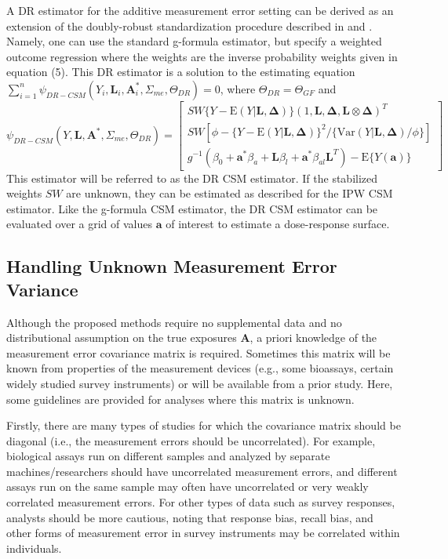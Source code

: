 \documentclass[useAMS,usenatbib,referee]{biom}
\begin{document}
A DR estimator for the additive measurement error setting can be derived as an extension of the doubly-robust standardization procedure described in \citet{vansteelandt2011} and \citet{kang2007}. Namely, one can use the standard g-formula estimator, but specify a weighted outcome regression where the weights are the inverse probability weights given in equation (5). This DR estimator is a solution to the estimating equation $\sum_{i=1}^{n} \psi_{DR-CSM}(Y_{i}, \bm{L}_{i}, \bm{A}_{i}^{*}, \Sigma_{me}, \Theta_{DR}) = 0$, where $\Theta_{DR} = \Theta_{GF}$ and
\begin{equation}
    \psi_{DR-CSM}(Y, \bm{L}, \bm{A}^{*}, \Sigma_{me}, \Theta_{DR}) =
    \begin{bmatrix}
       SW\{ Y - \text{E}(Y | \bm{L}, \bm{\Delta}) \} (1, \bm{L}, \bm{\Delta}, \bm{L} \otimes \bm{\Delta})^{T} \\
        SW[\phi - \{ Y - \text{E}(Y | \bm{L}, \bm{\Delta}) \}^{2} / \{ \text{Var}(Y | \bm{L}, \bm{\Delta}) / \phi \}] \\
        g^{-1}(\beta_{0} + \bm{a}^{*}\beta_{a} + \bm{L}\beta_{l} +
        \bm{a}^{*}\beta_{al}\bm{L}^{T}) - \text{E} \{ Y(\bm{a}) \}
    \end{bmatrix}
\end{equation}
This estimator will be referred to as the DR CSM estimator. If the stabilized weights $SW$ are unknown, they can be estimated as described for the IPW CSM estimator. Like the g-formula CSM estimator, the DR CSM estimator can be evaluated over a grid of values $\bm{a}$ of interest to estimate a dose-response surface.

\subsection{Handling Unknown Measurement Error Variance}

Although the proposed methods require no supplemental data and no distributional assumption on the true exposures $\bm{A}$, a priori knowledge of the measurement error covariance matrix is required. Sometimes this matrix will be known from properties of the measurement devices (e.g., some bioassays, certain widely studied survey instruments) or will be available from a prior study. Here, some guidelines are provided for analyses where this matrix is unknown.

Firstly, there are many types of studies for which the covariance matrix should be diagonal (i.e., the measurement errors should be uncorrelated). For example, biological assays run on different samples and analyzed by separate machines/researchers should have uncorrelated measurement errors, and different assays run on the same sample may often have uncorrelated or very weakly correlated measurement errors. For other types of data such as survey responses, analysts should be more cautious, noting that response bias, recall bias, and other forms of measurement error in survey instruments may be correlated within individuals.
\end{document}
